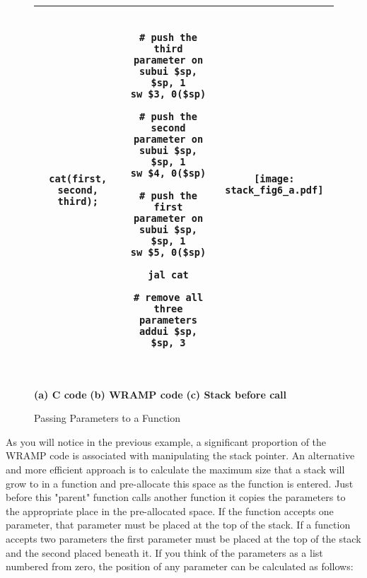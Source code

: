 %
%
\begin{figure}[!hbtp]
\begin{center}
\begin{footnotesize}
\begin{tabular}{|c|c|c|}
\hline
\begin{minipage}[t]{4.8cm}
\begin{verbatim}

cat(first, second, third);

\end{verbatim}
\end{minipage}
&
\begin{minipage}[c]{5.5cm}
\vspace{\topsep}
\begin{verbatim}

# push the third parameter on
subui $sp, $sp, 1
sw $3, 0($sp)

# push the second parameter on
subui $sp, $sp, 1
sw $4, 0($sp)

# push the first parameter on
subui $sp, $sp, 1
sw $5, 0($sp)

jal cat

# remove all three parameters
addui $sp, $sp, 3

\end{verbatim}
\end{minipage}
&
\begin{minipage}{4.2cm}
\begin{center}
\texttt{[image: stack\_fig6\_a.pdf]}
\end{center}
\end{minipage}\\
\hline
\end{tabular}
\\
\textbf{(a) C code}
\hspace{3cm}
\textbf{(b) WRAMP code}
\hspace{3cm}
\textbf{(c) Stack before call}\\

\caption{Passing Parameters to a Function}
\label{fig:parampassing}
\end{footnotesize}
\end{center}
\end{figure}

As you will notice in the previous example, a significant proportion of
the WRAMP code is associated with manipulating the stack pointer. An
alternative and more efficient approach is to calculate the maximum
size that a stack will grow to in a function and pre-allocate this
space as the function is entered. Just before this "parent" function
calls another function it copies the parameters to the appropriate
place in the pre-allocated space. If the function accepts one
parameter, that parameter must be placed at the top of the stack. If a
function accepts two parameters the first parameter must be placed at
the top of the stack and the second placed beneath it. If you think
of the parameters as a list numbered from zero, the position of any
parameter can be calculated as follows:

